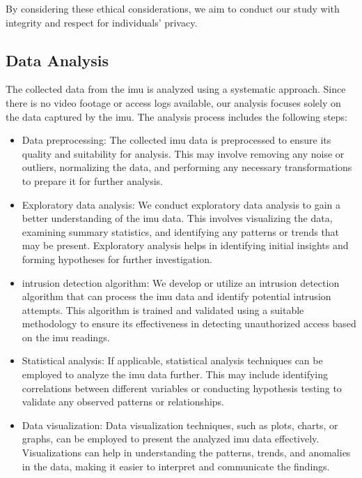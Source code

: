 \documentclass[../main.tex]{subfiles}
\begin{document}
    By considering these ethical considerations,
    we aim to conduct our study with integrity and respect for individuals' privacy.

    \subsection{Data Analysis}

    The collected data from the \gls{imu} is analyzed using a systematic approach.
    Since there is no video footage or access logs available,
    our analysis focuses solely on the data captured by the \gls{imu}.
    The analysis process includes the following steps:
    
    \begin{itemize}
    \item Data preprocessing: The collected \gls{imu} data is preprocessed to ensure its quality and suitability for analysis. This may involve removing any noise or outliers, normalizing the data, and performing any necessary transformations to prepare it for further analysis.
    \item Exploratory data analysis: We conduct exploratory data analysis to gain a better understanding of the \gls{imu} data. This involves visualizing the data, examining summary statistics, and identifying any patterns or trends that may be present. Exploratory analysis helps in identifying initial insights and forming hypotheses for further investigation.

    \item \gls{intrusion} detection algorithm: We develop or utilize an \gls{intrusion} detection algorithm that can process the \gls{imu} data and identify potential \gls{intrusion} attempts. This algorithm is trained and validated using a suitable methodology to ensure its effectiveness in detecting unauthorized access based on the \gls{imu} readings.

    \item Statistical analysis: If applicable, statistical analysis techniques can be employed to analyze the \gls{imu} data further. This may include identifying correlations between different variables or conducting hypothesis testing to validate any observed patterns or relationships.

    \item Data visualization: Data visualization techniques, such as plots, charts, or graphs, can be employed to present the analyzed \gls{imu} data effectively. Visualizations can help in understanding the patterns, trends, and anomalies in the data, making it easier to interpret and communicate the findings.
    
    \end{itemize}
\end{document}
